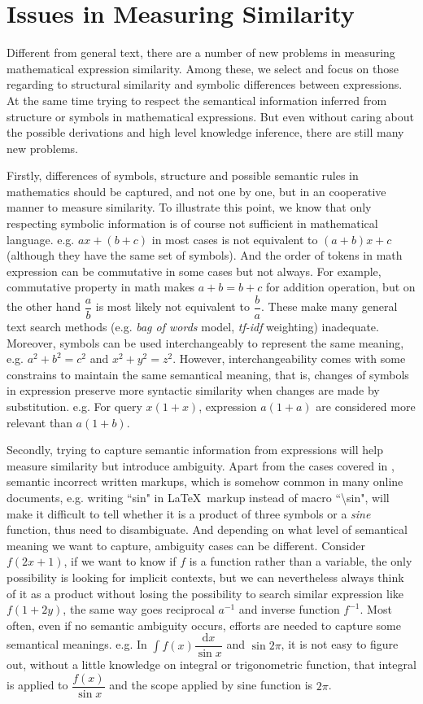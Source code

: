 \section{Issues in Measuring Similarity}
\label{measure_sim}
Different from general text, there are a number of new problems in measuring mathematical expression similarity. 
Among these, we select and focus on those regarding to structural similarity and symbolic differences between expressions. 
At the same time trying to respect the semantical information inferred from structure or symbols in mathematical expressions.
But even without caring about the possible derivations and high level knowledge inference, there are still many new problems.

Firstly, differences of symbols, structure and possible semantic rules in mathematics should be captured, and not one by one, but in an cooperative manner to measure similarity. 
To illustrate this point, we know that only respecting symbolic information is of course not sufficient in mathematical language. e.g. $ax+(b+c)$ in most cases is not equivalent to $(a+b)x+c$ (although they have the same set of symbols).
And the order of tokens in math expression can be commutative in some cases but not always. For example, commutative property in math makes $a+b=b+c$ for addition operation, but on the other hand $\dfrac a b$ is most likely not equivalent to $\dfrac b a$.
These make many general text search methods (e.g. \textit{bag of words} model, \textit{tf-idf} weighting) inadequate. 
Moreover, symbols can be used interchangeably to represent the same meaning, e.g. $a^2+b^2=c^2$ and $x^2+y^2=z^2$. 
However, interchangeability comes with some constrains to maintain the same semantical meaning, that is, changes of symbols in expression preserve more syntactic similarity when changes are made by substitution. e.g. For query $x(1+x)$, expression $a(1+a)$ are considered more relevant than $a(1+b)$. 

Secondly, trying to capture semantic information from expressions will help measure similarity but introduce ambiguity. 
Apart from the cases covered in \cite{parsing_tex}, semantic incorrect written markups, which is somehow common in many online documents, e.g. writing ``sin" in \LaTeX\ markup instead of macro ``\textbackslash sin", will make it difficult to tell whether it is a product of three symbols or a \textit{sine} function, thus need to disambiguate. 
And depending on what level of semantical meaning we want to capture, ambiguity cases can be different. 
Consider $f(2x+1)$, if we want to know if $f$ is a function rather than a variable, the only possibility is looking for implicit contexts, but we can nevertheless always think of it as a product without losing the possibility to search similar expression like $f(1 + 2y)$, the same way goes reciprocal $a^{-1}$ and inverse function $f^{-1}$. 
Most often, even if no semantic ambiguity occurs, efforts are needed to capture some semantical meanings. e.g. In $\displaystyle\int f(x) \dfrac{\mathrm{d}x}{\sin x}$ and $\sin 2 \pi$, it is not easy to figure out, without a little knowledge on integral or trigonometric function, that integral is applied to $\dfrac {f(x)} {\sin x}$ and the scope applied by sine function is $2 \pi$. 



